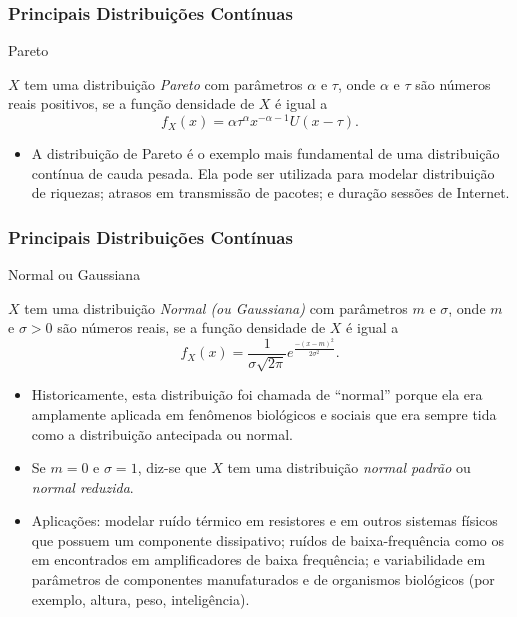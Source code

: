 \begin{frame}
\frametitle{\textbf{Principais Distribuições Contínuas}}
\baselineskip=13pt
\begin{block}{Pareto}

$X$ tem uma distribuição {\em
Pareto} com parâmetros $\alpha$ e $\tau$, onde $\alpha$ e $\tau$ são
números reais positivos, se a função densidade de $X$ é igual a
%
$$f_X(x)=\alpha \tau^{\alpha}x^{-\alpha-1}U(x-\tau).$$

\begin{itemize}
\item A distribuição de Pareto é o exemplo mais fundamental de uma
distribuição contínua de cauda pesada. Ela pode ser utilizada para modelar
distribuição de riquezas; atrasos em transmissão de pacotes; e
duração sessões de Internet.
\end{itemize}

\end{block}
\end{frame}

\begin{frame}
\frametitle{\textbf{Principais Distribuições Contínuas}}
\baselineskip=13pt
\begin{block}{Normal ou Gaussiana}

$X$ tem uma distribuição {\em
Normal (ou Gaussiana)} com parâmetros $m$ e $\sigma$, onde $m$ e
$\sigma>0$ são números reais, se a função densidade de $X$ é igual a
%
$$f_X(x)=\frac{1}{\sigma\sqrt{2\pi}}e^{\frac{-(x-m)^2}{2\sigma^2}}.$$

\begin{itemize}
\item Historicamente, esta distribuição foi chamada de ``normal'' porque
ela era amplamente aplicada em fenômenos biológicos e sociais que
era sempre tida como a distribuição antecipada ou normal.

\item Se $m=0$ e $\sigma=1$, diz-se que $X$ tem uma distribuição {\em normal padrão} ou {\em normal reduzida}.


\item Aplicações: modelar ruído térmico em resistores e em
outros sistemas físicos que possuem um componente dissipativo;
ruídos de baixa-frequência como os em encontrados em amplificadores
de baixa frequência; e variabilidade em parâmetros de componentes
manufaturados e de organismos biológicos (por exemplo, altura, peso,
inteligência).
\end{itemize}

\end{block}
\end{frame}

